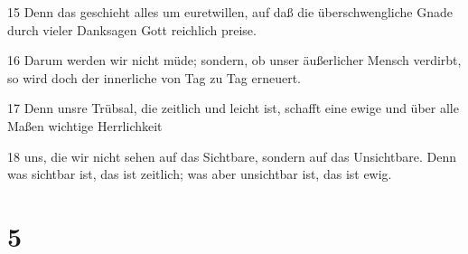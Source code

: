 \par 15 Denn das geschieht alles um euretwillen, auf daß die überschwengliche Gnade durch vieler Danksagen Gott reichlich preise.
\par 16 Darum werden wir nicht müde; sondern, ob unser äußerlicher Mensch verdirbt, so wird doch der innerliche von Tag zu Tag erneuert.
\par 17 Denn unsre Trübsal, die zeitlich und leicht ist, schafft eine ewige und über alle Maßen wichtige Herrlichkeit
\par 18 uns, die wir nicht sehen auf das Sichtbare, sondern auf das Unsichtbare. Denn was sichtbar ist, das ist zeitlich; was aber unsichtbar ist, das ist ewig.

\chapter{5}


